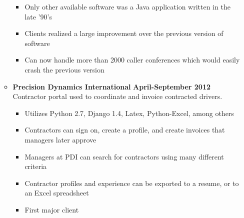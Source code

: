 \documentclass[overlapped]{res}
\begin{document}
\begin{resume}
\begin{itemize}[leftmargin=0in]
\begin{itemize}[leftmargin=0in]
\begin{samepage}
\begin{itemize}
                        \item[\textbullet] Only other available software was a Java application written in the late '90's
                        \item[\textbullet] Clients realized a large improvement over the previous version of software
                        \item[\textbullet] Can now handle more than 2000 caller conferences which would easily crash the previous version
                    \end{itemize}
                \end{samepage}
            \item[]
                \begin{samepage}
                    \textbf{Precision Dynamics International} \hfill \textbf{April-September 2012} \\
                    Contractor portal used to coordinate and invoice contracted drivers.
                    \begin{itemize}
                        \item[\textbullet] Utilizes Python 2.7, Django 1.4, Latex, Python-Excel, among others
                        \item[\textbullet] Contractors can sign on, create a profile, and create invoices that managers later approve
                        \item[\textbullet] Managers at PDI can search for contractors using many different criteria
                        \item[\textbullet] Contractor profiles and experience can be exported to a resume, or to an Excel spreadsheet
                        \item[\textbullet] First major client
                    \end{itemize}
                \end{samepage}
        \end{itemize}
\end{itemize}
\vspace{0.25in}




\end{resume}
\end{document}
